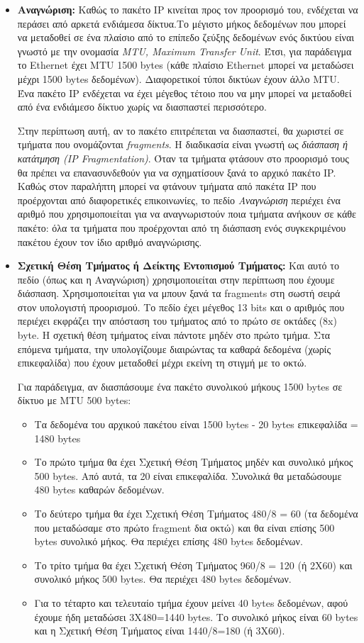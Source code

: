 \begin{itemize}
\item \textbf{Αναγνώριση:} Καθώς το πακέτο IP κινείται προς τον προορισμό του, ενδέχεται να περάσει από αρκετά ενδιάμεσα δίκτυα.Το μέγιστο μήκος δεδομένων που μπορεί να μεταδοθεί σε ένα πλαίσιο από το επίπεδο ζεύξης δεδομένων ενός δικτύου είναι γνωστό με την ονομασία \emph{MTU, Maximum Transfer Unit}. Έτσι, για παράδειγμα το Ethernet έχει MTU 1500 bytes (κάθε πλαίσιο Ethernet μπορεί να μεταδώσει μέχρι 1500 bytes δεδομένων). Διαφορετικοί τύποι δικτύων έχουν άλλο MTU. Ένα πακέτο IP ενδέχεται να έχει μέγεθος τέτοιο που να μην μπορεί να μεταδοθεί από ένα ενδιάμεσο δίκτυο χωρίς να διασπαστεί περισσότερο. 

Στην περίπτωση αυτή, αν το πακέτο επιτρέπεται να διασπαστεί, θα χωριστεί σε τμήματα που ονομάζονται \emph{fragments}. Η διαδικασία είναι γνωστή ως \emph{διάσπαση ή κατάτμηση (IP Fragmentation)}. Όταν τα τμήματα φτάσουν στο προορισμό τους θα πρέπει να επανασυνδεθούν για να σχηματίσουν ξανά το αρχικό πακέτο IP. Καθώς στον παραλήπτη μπορεί να φτάνουν τμήματα από πακέτα IP που προέρχονται από διαφορετικές επικοινωνίες, το πεδίο \emph{Αναγνώριση} περιέχει ένα αριθμό που χρησιμοποιείται για να αναγνωριστούν ποια τμήματα ανήκουν σε κάθε πακέτο: όλα τα τμήματα που προέρχονται από τη διάσπαση ενός συγκεκριμένου πακέτου έχουν τον ίδιο αριθμό αναγνώρισης.

\item \textbf{Σχετική Θέση Τμήματος ή Δείκτης Εντοπισμού Τμήματος:} Και αυτό το πεδίο (όπως και η Αναγνώριση) χρησιμοποιείται στην περίπτωση που έχουμε διάσπαση. Χρησιμοποιείται για να μπουν ξανά τα fragments στη σωστή σειρά στον υπολογιστή προορισμού. Το πεδίο έχει μέγεθος 13 bits και ο αριθμός που περιέχει εκφράζει την απόσταση του τμήματος από το πρώτο σε οκτάδες (8x) byte. Η σχετική θέση τμήματος είναι πάντοτε μηδέν στο πρώτο τμήμα. Στα επόμενα τμήματα, την υπολογίζουμε διαιρώντας τα καθαρά δεδομένα (χωρίς επικεφαλίδα) που έχουν μεταδοθεί μέχρι εκείνη τη στιγμή  με το οκτώ.

Για παράδειγμα, αν διασπάσουμε ένα πακέτο συνολικού μήκους 1500 bytes σε δίκτυο με MTU 500 bytes:

\begin{itemize}
\item Τα δεδομένα του αρχικού πακέτου είναι 1500 bytes - 20 bytes επικεφαλίδα = 1480 bytes
\item Το πρώτο τμήμα θα έχει Σχετική Θέση Τμήματος μηδέν και συνολικό μήκος 500 bytes. Από αυτά, τα 20 είναι επικεφαλίδα. Συνολικά θα μεταδώσουμε 480 bytes καθαρών δεδομένων.
\item Το δεύτερο τμήμα θα έχει Σχετική Θέση Τμήματος 480/8 = 60 (τα δεδομένα που μεταδώσαμε στο πρώτο fragment δια οκτώ) και θα είναι επίσης 500 bytes συνολικό μήκος. Θα περιέχει επίσης 480 bytes δεδομένων.
\item Το τρίτο τμήμα θα έχει Σχετική Θέση Τμήματος 960/8 = 120 (ή 2Χ60) και συνολικό μήκος 500 bytes. Θα περιέχει 480 bytes δεδομένων.
\item Για το τέταρτο και τελευταίο τμήμα έχουν μείνει 40 bytes δεδομένων, αφού έχουμε ήδη μεταδώσει 3Χ480=1440 bytes. Το συνολικό μήκος είναι 60 bytes και η Σχετική Θέση Τμήματος είναι 1440/8=180 (ή 3Χ60).
\end{itemize}   


\end{itemize}
